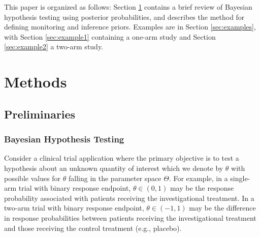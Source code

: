 \documentclass[useAMS,usenatbib,referee]{biom}
\begin{document}
This paper is organized as follows: Section \ref{sec:methods} contains a brief review of Bayesian hypothesis testing using posterior probabilities, and describes the method for defining monitoring and inference priors. Examples are in Section \ref{sec:examples}, with Section \ref{sec:example1} containing a one-arm study and Section \ref{sec:example2} a two-arm study.
\section{Methods}\label{sec:methods}

\subsection{Preliminaries}\label{sec:preliminaries}
\subsubsection{Bayesian Hypothesis Testing}
Consider a clinical trial application where the primary objective is to test a hypothesis about an unknown quantity of interest which we denote by $\theta$ with possible values
for $\theta$ falling in the parameter space $\Theta$.
%
For example, in a single-arm trial with binary response endpoint, $\theta \in (0,1)$ may be the response probability associated with patients receiving the investigational treatment.
%
In a two-arm trial with binary response endpoint, $\theta \in (-1,1)$ may be the difference in response probabilities between patients receiving the investigational treatment 
and those receiving the control treatment (e.g., placebo).
\end{document}
